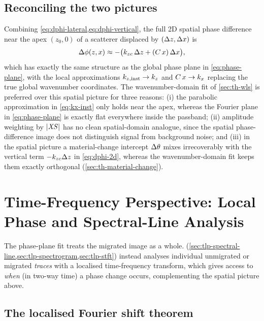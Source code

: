 \subsection{Reconciling the two pictures}

Combining \cref{eq:dphi-lateral,eq:dphi-vertical}, the full 2D spatial phase
difference near the apex $(z_0,0)$ of a scatterer displaced by
$(\Delta z,\Delta x)$ is
\begin{equation}
  \Delta\phi(z,x) \approx -\bigl(k_{zc}\,\Delta z + (C\,x)\,\Delta x\bigr),
  \label{eq:dphi-2d}
\end{equation}
which has exactly the same structure as the global phase plane in
\cref{eq:phase-plane}, with the local approximations $k_{z,\mathrm{inst}}\to k_z$
and $C\,x \to k_x$ replacing the true global wavenumber coordinates. The
wavenumber-domain fit of \cref{sec:th-wls} is preferred over this spatial
picture for three reasons: (i) the parabolic approximation in
\cref{eq:kx-inst} only holds near the apex, whereas the Fourier plane in
\cref{eq:phase-plane} is exactly flat everywhere inside the passband; (ii)
amplitude weighting by $|\mathit{XS}|$ has no clean spatial-domain analogue, since the
spatial phase-difference image does not distinguish signal from background
noise; and (iii) in the spatial picture a material-change intercept
$\Delta \theta$ mixes irrecoverably with the vertical term $-k_{zc}\Delta z$ in
\cref{eq:dphi-2d}, whereas the wavenumber-domain fit keeps them exactly
orthogonal (\cref{sec:th-material-change}).

\section{Time-Frequency Perspective: Local Phase and Spectral-Line Analysis}
\label{sec:th-local}

The phase-plane fit treats the migrated image as a whole. 
(\cref{sec:tlp-spectral-line,sec:tlp-spectrogram,sec:tlp-stft}) instead
analyses individual unmigrated or migrated \emph{traces} with a localised
time-frequency transform, which gives access to \emph{when} (in two-way
time) a phase change occurs, complementing the spatial picture above.

\subsection{The localised Fourier shift theorem}

